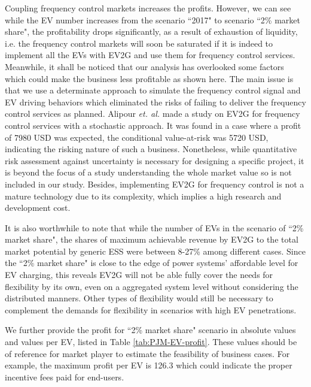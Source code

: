 Coupling frequency control markets increases the profits. However, we can see while the EV number increases from the scenario ``2017" to scenario ``2\% market share", the profitability drops significantly, as a result of exhaustion of liquidity, i.e. the frequency control markets will soon be saturated if it is indeed to implement all the EVs with EV2G and use them for frequency control services. Meanwhile, it shall be noticed that our analysis has overlooked some factors which could make the business less profitable as shown here. The main issue is that we use a determinate approach to simulate the frequency control signal and EV driving behaviors which eliminated the risks of failing to deliver the frequency control services as planned. Alipour \textit{et. al.}\cite{Alipour2017} made a study on EV2G for frequency control services with a stochastic approach. It was found in a case where a profit of 7980 USD was expected, the conditional value-at-risk was 5720 USD, indicating the risking nature of such a business. %
Nonetheless, while quantitative risk assessment against uncertainty is necessary for designing a specific project, it is beyond the focus of a study understanding the whole market value so is not included in our study. Besides, implementing EV2G for frequency control is not a mature technology due to its complexity\cite{Peng2017,Shafie-Khah2015,Bessa2014,Bessa2013}, which implies a high research and development cost.

It is also worthwhile to note that while the number of EVs in the scenario of ``2\% market share", the shares of  maximum achievable revenue by EV2G to the total market potential by generic ESS were between 8-27\% among different cases. Since the ``2\% market share" is close to the edge of power systems' affordable level for EV charging, this reveals EV2G will not be able fully cover the needs for flexibility by its own, even on a aggregated system level without considering the distributed manners. Other types of flexibility would still be necessary to complement the demands for flexibility in scenarios with high EV penetrations.

We further provide the profit for ``2\% market share" scenario in absolute values and values per EV, listed in Table \ref{tab:PJM-EV-profit}. These values should be of reference for market player to estimate the feasibility of business cases. For example, the maximum profit per EV is 126.3 which could indicate the proper incentive fees paid for end-users.

